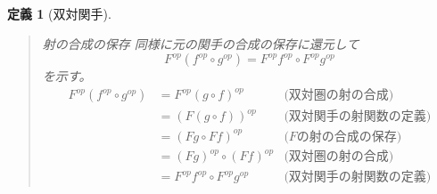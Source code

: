 \documentclass[uplatex,dvipdfmx]{jsarticle}
\newtheorem{define}[proof]{定義}
\numberwithin{proof}{subsection}
\newenvironment{mydescription}
{\begin{description}
  \setlength{\parskip}{0.5cm}
}
{\end{description}}
\begin{document}
\begin{define}[双対関手]
\begin{quote}
\begin{mydescription}
				\item[射の合成の保存]同様に元の関手の合成の保存に還元して\[F^{op}(f^{op}\circ g^{op})=F^{op}f^{op}\circ F^{op}g^{op}\]を示す。
				\begin{align*}
					F^{op}(f^{op}\circ g^{op})&= F^{op}(g\circ f)^{op}&\text{(双対圏の射の合成)}\\
					&=(F(g\circ f))^{op}&\text{(双対関手の射関数の定義)}\\
					&=(Fg\circ Ff)^{op}&\text{($F$の射の合成の保存)}\\
					&=(Fg)^{op}\circ (Ff)^{op}&\text{(双対圏の射の合成)}\\
					&=F^{op}f^{op}\circ F^{op}g^{op}&\text{(双対関手の射関数の定義)}
				\end{align*}
			\end{mydescription}
		\end{quote}
	\end{define}
\end{document}

